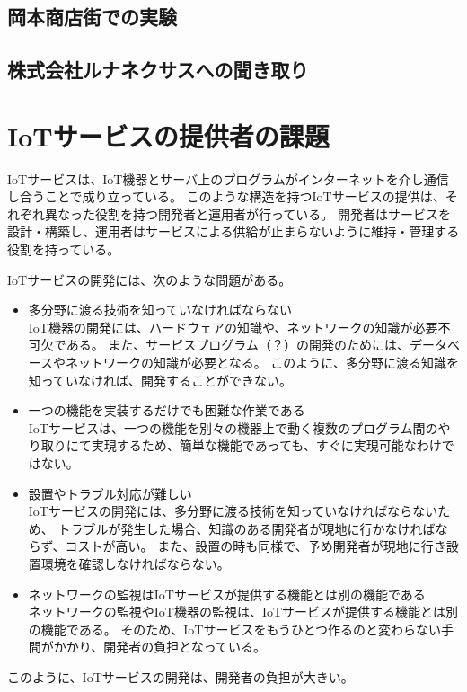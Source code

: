 \subsection{岡本商店街での実験}


\subsection{株式会社ルナネクサスへの聞き取り}



\section{IoTサービスの提供者の課題}
IoTサービスは、IoT機器とサーバ上のプログラムがインターネットを介し通信し合うことで成り立っている。
このような構造を持つIoTサービスの提供は、それぞれ異なった役割を持つ開発者と運用者が行っている。
開発者はサービスを設計・構築し、運用者はサービスによる供給が止まらないように維持・管理する役割を持っている。

IoTサービスの開発には、次のような問題がある。
\begin{itemize}
\item 多分野に渡る技術を知っていなければならない\\
	IoT機器の開発には、ハードウェアの知識や、ネットワークの知識が必要不可欠である。
	また、サービスプログラム（？）の開発のためには、データベースやネットワークの知識が必要となる。
	このように、多分野に渡る知識を知っていなければ、開発することができない。
\item 一つの機能を実装するだけでも困難な作業である\\
	IoTサービスは、一つの機能を別々の機器上で動く複数のプログラム間のやり取りにて実現するため、簡単な機能であっても、すぐに実現可能なわけではない。
\item 設置やトラブル対応が難しい\\
	IoTサービスの開発には、多分野に渡る技術を知っていなければならないため、
	トラブルが発生した場合、知識のある開発者が現地に行かなければならず、コストが高い。
	また、設置の時も同様で、予め開発者が現地に行き設置環境を確認しなければならない。
\item ネットワークの監視はIoTサービスが提供する機能とは別の機能である\\
	ネットワークの監視やIoT機器の監視は、IoTサービスが提供する機能とは別の機能である。
	そのため、IoTサービスをもうひとつ作るのと変わらない手間がかかり、開発者の負担となっている。
\end{itemize}
このように、IoTサービスの開発は、開発者の負担が大きい。

